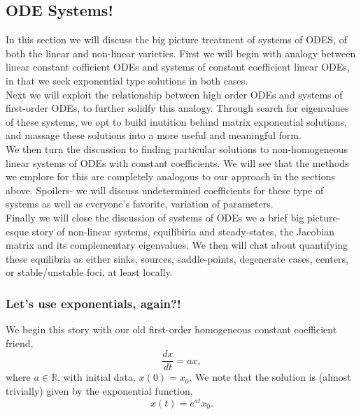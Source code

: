%
%
%
%

\subsection{ODE Systems!}

In this section we will discuss the big picture treatment of systems of ODES, of both the linear and non-linear varieties. First we will begin with analogy between linear constant cofficient ODEs and systems of constant coefficient linear ODEs, in that we seek exponential type solutions in both cases.\\

Next we will exploit the relationship between high order ODEs and systems of first-order ODEs, to further solidfy this analogy. Through search for eigenvalues of these systems, we opt to build inutition behind matrix exponential solutions, and massage these solutions into a more useful and meaningful form. \\

We then turn the discussion to finding particular solutions to non-homogeneous linear systems of ODEs with constant coefficients. We will see that the methods we emplore for this are completely analogous to our approach in the sections above. Spoilers- we will discuss undetermined coefficients for these type of systems as well as everyone's favorite, variation of parameters.\\

Finally we will close the discussion of systems of ODEs we a brief big picture-esque story of non-linear systems, equilibiria and steady-states, the Jacobian matrix and its complementary eigenvalues. We then will chat about quantifying these equilibria as either sinks, sources, saddle-points, degenerate cases, centers, or stable/unstable foci, at least locally.\\


%
%
%
%
\subsubsection{Let's use exponentials, again?!}

We begin this story with our old first-order homogeneous constant coefficient friend, $$\frac{dx}{dt} = ax,$$ where $a\in\mathbb{R}$, with initial data, $x(0)=x_0.$ We note that the solution is (almost trivially) given by the exponential function, 
$$x(t) = e^{at} x_0.$$

